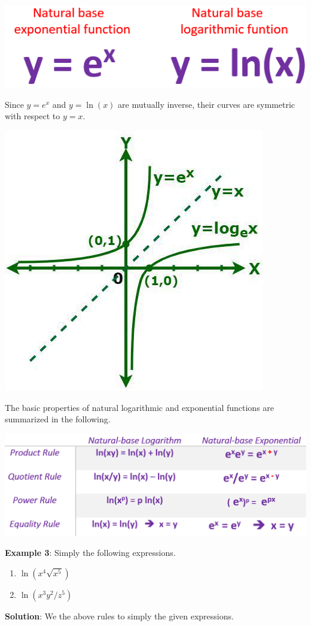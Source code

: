 \documentclass[
]{book}
\begin{document}
\hfill\break

\begin{center}\includegraphics[width=0.4\linewidth]{img04/w04-ExpLogNaturalComparison} \end{center}

Since \(y = e^x\) and \(y = \ln(x)\) are mutually inverse, their curves are symmetric with respect to \(y = x\).

\begin{center}\includegraphics[width=0.4\linewidth]{img04/w04-NaturalExpLog} \end{center}

The basic properties of natural logarithmic and exponential functions are summarized in the following.

\begin{center}\includegraphics[width=0.7\linewidth]{img04/w04-NaturalExpLogProperties} \end{center}

\textbf{Example 3}: Simply the following expressions.

\begin{enumerate}
\def\labelenumi{\arabic{enumi}.}
\item
  \(\ln(x^4\sqrt{x^5})\)
\item
  \(\ln(x^3y^2/z^5)\)
\end{enumerate}

\textbf{Solution}: We the above rules to simply the given expressions.
\end{document}
